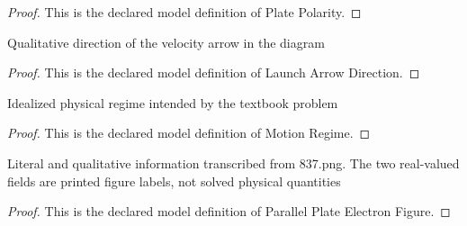 \begin{proof}
  This is the declared model definition of Plate Polarity.
\end{proof}
\begin{definition}
  \label{def:physics:phyx-mini-0837:phyxminiproblems-problemphyxmini0837-launcharrowdirection}
  Qualitative direction of the velocity arrow in the diagram
\end{definition}
\begin{proof}
  This is the declared model definition of Launch Arrow Direction.
\end{proof}
\begin{definition}
  \label{def:physics:phyx-mini-0837:phyxminiproblems-problemphyxmini0837-motionregime}
  Idealized physical regime intended by the textbook problem
\end{definition}
\begin{proof}
  This is the declared model definition of Motion Regime.
\end{proof}
\begin{definition}
  \label{def:physics:phyx-mini-0837:phyxminiproblems-problemphyxmini0837-parallelplateelectronfigure}
  Literal and qualitative information transcribed from 837.png. The two real-valued fields are printed figure labels, not solved physical quantities
\end{definition}
\begin{proof}
  This is the declared model definition of Parallel Plate Electron Figure.
\end{proof}
